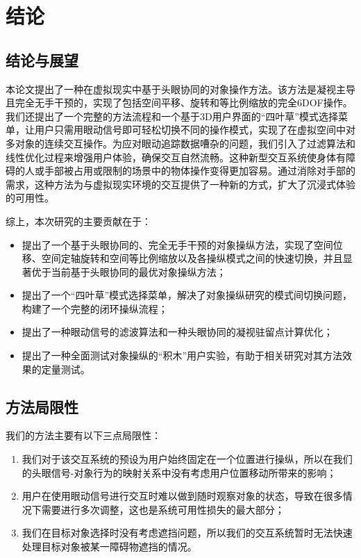 \chapter{结论}

\section{结论与展望}

本论文提出了一种在虚拟现实中基于头眼协同的对象操作方法。该方法是凝视主导且完全无手干预的，实现了包括空间平移、旋转和等比例缩放的完全6DOF操作。我们还提出了一个完整的方法流程和一个基于3D用户界面的“四叶草”模式选择菜单，让用户只需用眼动信号即可轻松切换不同的操作模式，实现了在虚拟空间中对多对象的连续交互操作。为应对眼动追踪数据嘈杂的问题，我们引入了过滤算法和线性优化过程来增强用户体验，确保交互自然流畅。这种新型交互系统使身体有障碍的人或手部被占用或限制的场景中的物体操作变得更加容易。通过消除对手部的需求，这种方法为与虚拟现实环境的交互提供了一种新的方式，扩大了沉浸式体验的可用性。

综上，本次研究的主要贡献在于：

\begin{itemize}
	\item 提出了一个基于头眼协同的、完全无手干预的对象操纵方法，实现了空间位移、空间定轴旋转和空间等比例缩放以及各操纵模式之间的快速切换，并且显著优于当前基于头眼协同的最优对象操纵方法；
	\item 提出了一个“四叶草”模式选择菜单，解决了对象操纵研究的模式间切换问题，构建了一个完整的闭环操纵流程；
	\item 提出了一种眼动信号的滤波算法和一种头眼协同的凝视驻留点计算优化；
	\item 提出了一种全面测试对象操纵的“积木”用户实验，有助于相关研究对其方法效果的定量测试。
\end{itemize}

\section{方法局限性}

我们的方法主要有以下三点局限性：
\begin{enumerate}
	\item 我们对于该交互系统的预设为用户始终固定在一个位置进行操纵，所以在我们的头眼信号-对象行为的映射关系中没有考虑用户位置移动所带来的影响；
	\item 用户在使用眼动信号进行交互时难以做到随时观察对象的状态，导致在很多情况下需要进行多次调整，这也是系统可用性损失的最大部分；
	\item 我们在目标对象选择时没有考虑遮挡问题，所以我们的交互系统暂时无法快速处理目标对象被某一障碍物遮挡的情况。
\end{enumerate}

